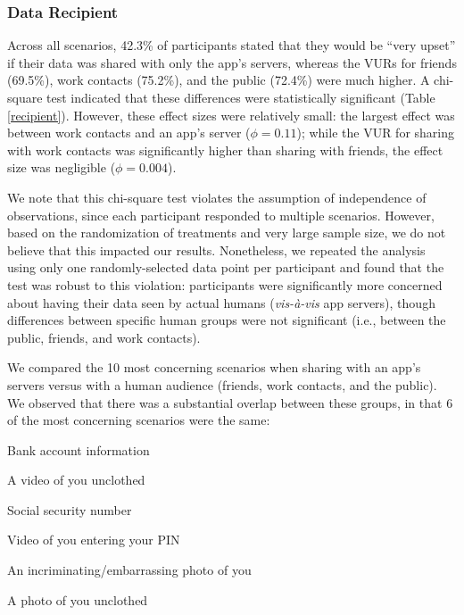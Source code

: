 \documentclass{acm_proc_article-sp}
\newenvironment{packed_enum}{
\begin{enumerate}
  \setlength{\itemsep}{1pt}
  \setlength{\parskip}{0pt}
  \setlength{\parsep}{0pt}
}{\end{enumerate}}
\begin{document}
\subsubsection{Data Recipient}
Across all scenarios, 42.3\% of participants stated that they would be ``very upset'' if their data was shared with only the app's servers, whereas the VURs for friends (69.5\%), work contacts (75.2\%), and the public (72.4\%) were much higher. A chi-square test indicated that these differences were statistically significant (Table \ref{recipient}). However, these effect sizes were relatively small: the largest effect was between work contacts and an app's server ($\phi=0.11$); while the VUR for sharing with work contacts was significantly higher than sharing with friends, the effect size was negligible ($\phi=0.004$). 

We note that this chi-square test violates the assumption of independence of observations, since each participant responded to multiple scenarios. However, based on the randomization of treatments and very large sample size, we do not believe that this impacted our results. Nonetheless, we repeated the analysis using only one randomly-selected data point per participant and found that the test was robust to this violation: participants were significantly more concerned about having their data seen by actual humans ({\it vis-{\`a}-vis} app servers), though differences between specific human groups were not significant (i.e., between the public, friends, and work contacts).


We compared the 10 most concerning scenarios when sharing with an app's servers versus with a human audience (friends, work contacts, and the public). We observed that there was a substantial overlap between these groups, in that 6 of the most concerning scenarios were the same: \\[-.8cm]

\begin{packed_enum}
\item Bank account information
\item A video of you unclothed
\item Social security number
\item Video of you entering your PIN
\item An incriminating/embarrassing photo of you
\item A photo of you unclothed \\[-.8cm]
\end{packed_enum}
\end{document}

